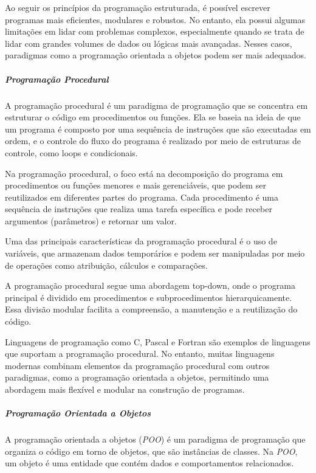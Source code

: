 \documentclass[a4paper, 12pt, onecolumn,singlespacing]{article}
\begin{document}
	Ao seguir os princípios da programação estruturada, é possível escrever programas mais eficientes, modulares e robustos. No entanto, ela possui algumas limitações em lidar com problemas complexos, especialmente quando se trata de lidar com grandes volumes de dados ou lógicas mais avançadas. Nesses casos, paradigmas como a programação orientada a objetos podem ser mais adequados.
	
	\subparagraph{Programação Procedural} A programação procedural é um paradigma de programação que se concentra em estruturar o código em procedimentos ou funções. Ela se baseia na ideia de que um programa é composto por uma sequência de instruções que são executadas em ordem, e o controle do fluxo do programa é realizado por meio de estruturas de controle, como loops e condicionais.
	
	Na programação procedural, o foco está na decomposição do programa em procedimentos ou funções menores e mais gerenciáveis, que podem ser reutilizados em diferentes partes do programa. Cada procedimento é uma sequência de instruções que realiza uma tarefa específica e pode receber argumentos (parâmetros) e retornar um valor.
	
	Uma das principais características da programação procedural é o uso de variáveis, que armazenam dados temporários e podem ser manipuladas por meio de operações como atribuição, cálculos e comparações.
	
	A programação procedural segue uma abordagem top-down, onde o programa principal é dividido em procedimentos e subprocedimentos hierarquicamente. Essa divisão modular facilita a compreensão, a manutenção e a reutilização do código.
	
	Linguagens de programação como C, Pascal e Fortran são exemplos de linguagens que suportam a programação procedural. No entanto, muitas linguagens modernas combinam elementos da programação procedural com outros paradigmas, como a programação orientada a objetos, permitindo uma abordagem mais flexível e modular na construção de programas.
	
	\subparagraph{Programação Orientada a Objetos}
	A programação orientada a objetos (\textit{POO}) é um paradigma de programação que organiza o código em torno de objetos, que são instâncias de classes. Na \textit{POO}, um objeto é uma entidade que contém dados e comportamentos relacionados.
	
\end{document}
